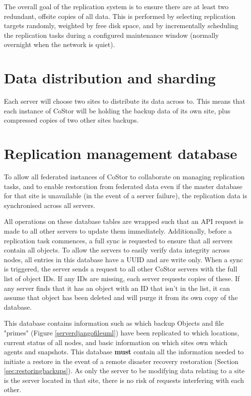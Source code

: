 \documentclass[bsc,frontabs,twoside,singlespacing,parskip,deptreport]{infthesis}     %
\begin{document}
The overall goal of the replication system is to ensure there are at least two redundant, offsite
copies of all data. This is performed by selecting replication targets randomly, weighted by 
free disk space, and by incrementally scheduling the replication tasks during a configured
maintenance window (normally overnight when the network is quiet).

\section{Data distribution and sharding}

Each server will choose two sites to distribute its data across to. This means that each instance
of CoStor will be holding the backup data of its own site, plus compressed copies of two other
sites backups.

\section{Replication management database}

To allow all federated instances of CoStor to collaborate on managing replication tasks, and to
enable restoration from federated data even if the master database for that site is unavailable 
(in the event of a server failure), the replication data is synchronised across all servers.

All operations on these database tables are wrapped such that an API request is made to all other
servers to update them immediately. Additionally, before a replication task commences, a full
sync is requested to ensure that all servers contain all objects. To allow the servers to easily
verify data integrity across nodes, all entries in this database have a UUID and are write only. 
When a sync is triggered, the server sends a request to all other CoStor servers with the full 
list of object IDs. If any IDs are missing, each server requests copies of these. If any server
finds that it has an object with an ID that isn't in the list, it can assume that object has been 
deleted and will purge it from its own copy of the database.

This database contains information such as which backup Objects and file "primes" 
(Figure \ref{serverdjangofileuml}) have been replicated to which locations, current status of all
nodes, and basic information on which sites own which agents and snapshots. This database 
\textbf{must} contain all the information needed to initiate a restore in the event of a remote 
disaster recovery restoration (Section \ref{sec:restoringbackups}). As only the server to
be modifying data relating to a site is the server located in that site, there is no risk of 
requests interfering with each other.
\end{document}
